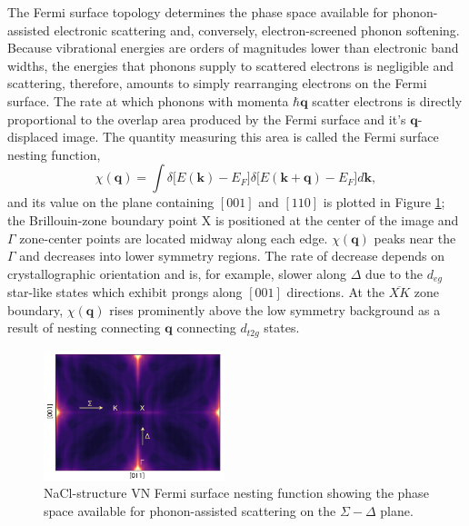 \documentclass[twocolumn,showpacs,preprintnumbers,superscriptaddress,prb,floatfix,aps,10pt]{revtex4-1}
\renewcommand{\vec}[1]{\ensuremath{\mathbf{#1}}}
\newcommand*{\nesting}{\chi(\vec{q})}
\begin{document}
The Fermi surface topology determines the phase space available for phonon-assisted electronic scattering and, conversely, electron-screened phonon softening. Because vibrational energies are orders of magnitudes lower than electronic band widths, the energies that phonons supply to scattered electrons is negligible and scattering, therefore, amounts to simply rearranging electrons on the Fermi surface. The rate at which phonons with momenta $\hbar\vec{q}$ scatter electrons is directly proportional to the overlap area produced by the Fermi surface and it's $\vec{q}$-displaced image. The quantity measuring this area is called the Fermi surface nesting function, 
%
\begin{equation}
\label{eq:nesting}
\nesting = \int \delta\big[ E(\vec{k}) - E_F \big] \delta\big[ E(\vec{k + q}) - E_F \big] d\vec{k},
\end{equation}
%
and its value on the plane containing $\mathrm{[001]}$ and $\mathrm{[110]}$ is plotted in Figure \ref{fig:nesting_2d}; the Brillouin-zone boundary point $\mathrm{X}$ is positioned at the center of the image and $\Gamma$ zone-center points are located midway along each edge. $\nesting$ peaks near the $\Gamma$ and decreases into lower symmetry regions. The rate of decrease depends on crystallographic orientation and is, for example, slower along $\Delta$ due to the $d_{eg}$ star-like states which exhibit prongs along $\mathrm{[001]}$ directions. At the $\overline{XK}$ zone boundary, $\nesting$ rises  prominently above the low symmetry background as a result of nesting connecting $\vec{q}$ connecting $d_{t2g}$ states. 
%
\begin{figure}[h]
\includegraphics[width=0.47\textwidth]{Figure_3_nesting_2d.pdf}
\caption{\label{fig:nesting_2d} NaCl-structure VN Fermi surface nesting function showing the phase space available for phonon-assisted scattering on the $\Sigma-\Delta$ plane.}
\end{figure}
\end{document}

